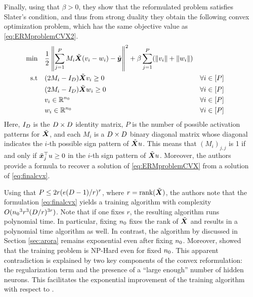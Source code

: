 Finally, using that $\beta > 0$, they show that the reformulated problem satisfies Slater's condition, and thus from strong duality they obtain the following convex optimization problem, which has the same objective value as \eqref{eq:ERMproblemCVX2}.
%
\begin{subequations} \label{eq:finalcvx}
    \begin{align}
    \min&\quad \frac{1}{2} \left\|\sum_{j=1}^{P} M_i \tilde{{\bm{X}}}(v_i - w_i) - \tilde{{\bm{y}}} \right\|^2 + 
    \beta \sum_{j=1}^{P}( \| v_i\| + \|w_i\|)\\
    \mbox{s.t} & \quad  (2M_i - I_D) \tilde{{\bm{X}}} v_i \geq 0  && \forall i\in [P]\\
    & \quad  (2M_i - I_D) \tilde{{\bm{X}}} w_i \geq 0 && \forall i\in [P] \\
    & \quad  v_i \in \mathbb{R}^{n_0}  &&\forall i\in [P]\\
    & \quad w_i \in \mathbb{R}^{n_0} && \forall i\in [P]
    \end{align}
\end{subequations}
%
Here, $I_D$ is the $D \times D$ identity matrix, $P$ is the number of possible activation patterns for $\tilde{{\bm{X}}}$, and each  $M_i$ is a $D \times D$ binary diagonal matrix whose diagonal indicates the $i$-th possible sign pattern of $\tilde{{\bm{X}}} u$. This means that $(M_{i})_{j,j}$ is 1 if and only if $\tilde{{\bm{x}}}_j^\top u \geq 0$ in the $i$-th sign pattern of $\tilde{{\bm{X}}} u$. Moreover, the authors provide a formula to recover a solution of \eqref{eq:ERMproblemCVX} from a solution of \eqref{eq:finalcvx}.

Using that $P\leq 2r(e(D-1)/r)^r$, where $r=\mbox{rank}(\tilde{{\bm{X}}})$, the authors note that the formulation \eqref{eq:finalcvx} yields a training algorithm with complexity $O({n_0}^3 r^3 (D/r)^{3r})$. Note that if one fixes $r$, the resulting algorithm runs polynomial time. In particular, fixing ${n_0}$ fixes the rank of $\tilde{{\bm{X}}}$ and results in a polynomial time algorithm as well. In contrast, the algorithm by \cite{arora2018understanding} discussed in Section \ref{sec:arora} remains exponential even after fixing ${n_0}$. Moreover,  \cite{froese2023training} showed that the training problem is NP-Hard even for fixed ${n_0}$.
%
This apparent contradiction is explained by two key components of the convex reformulation: the regularization term and the presence of a ``large enough'' number of hidden neurons. This facilitates the exponential improvement of the training algorithm with respect to \cite{arora2018understanding}.

